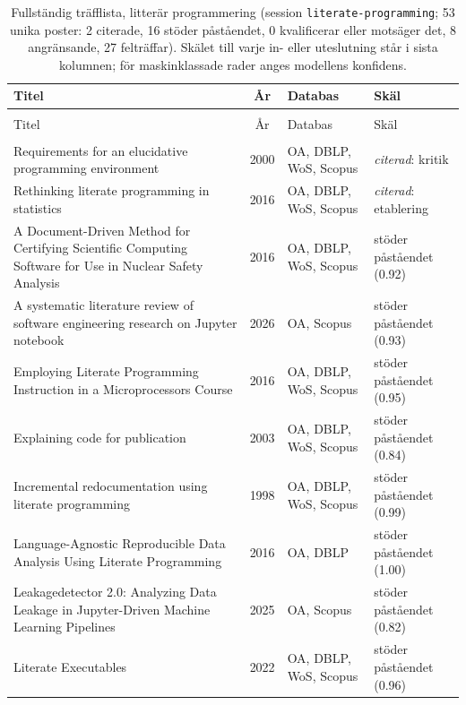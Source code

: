 \begingroup\footnotesize
\begin{longtable}{@{}%
  >{\raggedright\arraybackslash}p{}c%
  >{\raggedright\arraybackslash}p{}%
  >{\raggedright\arraybackslash}p{}@{}}
\caption{Fullständig träfflista, litterär programmering (session \texttt{literate-programming}; 53 unika poster: 2 citerade, 16 stöder påståendet, 0 kvalificerar eller motsäger det, 8 angränsande, 27 felträffar).  Skälet till varje in- eller uteslutning står i sista kolumnen; för maskinklassade rader anges modellens konfidens.}\label{tab:sok-litprog}\\
\toprule
Titel & År & Databas & Skäl \\
\midrule
\endfirsthead
\multicolumn{4}{@{}l}{\emph{\tablename~\thetable{} (forts.)}}\\
\toprule Titel & År & Databas & Skäl \\ \midrule
\endhead
\midrule \multicolumn{4}{r@{}}{\emph{forts.\ på nästa sida}}\\
\endfoot
\bottomrule
\endlastfoot
Requirements for an elucidative programming environment & 2000 & OA, DBLP, WoS, Scopus & \emph{citerad}: kritik \\
Rethinking literate programming in statistics & 2016 & OA, DBLP, WoS, Scopus & \emph{citerad}: etablering \\
A Document-Driven Method for Certifying Scientific Computing Software for Use in Nuclear Safety Analysis & 2016 & OA, DBLP, WoS, Scopus & stöder påståendet (0.92) \\
A systematic literature review of software engineering research on Jupyter notebook & 2026 & OA, Scopus & stöder påståendet (0.93) \\
Employing Literate Programming Instruction in a Microprocessors Course & 2016 & OA, DBLP, WoS, Scopus & stöder påståendet (0.95) \\
Explaining code for publication & 2003 & OA, DBLP, WoS, Scopus & stöder påståendet (0.84) \\
Incremental redocumentation using literate programming & 1998 & OA, DBLP, WoS, Scopus & stöder påståendet (0.99) \\
Language-Agnostic Reproducible Data Analysis Using Literate Programming & 2016 & OA, DBLP & stöder påståendet (1.00) \\
Leakagedetector 2.0: Analyzing Data Leakage in Jupyter-Driven Machine Learning Pipelines & 2025 & OA, Scopus & stöder påståendet (0.82) \\
Literate Executables & 2022 & OA, DBLP, WoS, Scopus & stöder påståendet (0.96) \\

\end{longtable}
